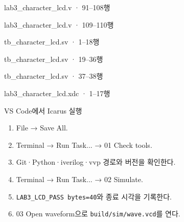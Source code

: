 \begin{frame}[fragile]{lab3\_character\_lcd.v · 91–108행}

\end{frame}

\begin{frame}[fragile]{lab3\_character\_lcd.v · 109–110행}

\end{frame}

\begin{frame}[fragile]{tb\_character\_lcd.sv · 1–18행}

\end{frame}

\begin{frame}[fragile]{tb\_character\_lcd.sv · 19–36행}

\end{frame}

\begin{frame}[fragile]{tb\_character\_lcd.sv · 37–38행}

\end{frame}

\begin{frame}[fragile]{lab3\_character\_lcd.xdc · 1–17행}

\end{frame}


\begin{frame}[label=simulate]{VS Code에서 Icarus 실행}
\small
\begin{enumerate}
\item File → Save All.
\item Terminal → Run Task... → 01 Check tools.
\item Git·Python·iverilog·vvp 경로와 버전을 확인한다.
\item Terminal → Run Task... → 02 Simulate.
\item \texttt{LAB3\_LCD\_PASS bytes=40}와 종료 시각을 기록한다.
\item 03 Open waveform으로 \texttt{build/sim/wave.vcd}를 연다.
\end{enumerate}
\end{frame}

